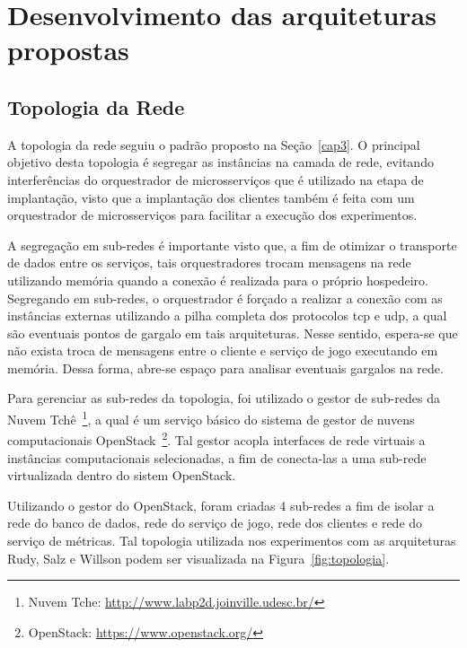  
\chapter{Desenvolvimento das arquiteturas propostas}
\label{cap5}


\section{Topologia da Rede}
\label{sec:topologia}

A topologia da rede seguiu o padrão proposto na Seção~\ref{cap3}.
%
O principal objetivo desta topologia é segregar as instâncias na camada de rede, evitando interferências do orquestrador de microsserviços que é utilizado na etapa de implantação, visto que a implantação dos clientes também é feita com um orquestrador de microsserviços para facilitar a execução dos experimentos.

A segregação em sub-redes é importante visto que, a fim de otimizar o transporte de dados entre os serviços, tais orquestradores trocam mensagens na rede utilizando memória quando a conexão é realizada para o próprio hospedeiro.
%
Segregando em sub-redes, o orquestrador é forçado a realizar a conexão com as instâncias externas utilizando a pilha completa dos protocolos \ac{tcp} e \ac{udp}, a qual são eventuais pontos de gargalo em tais arquiteturas.
%
Nesse sentido, espera-se que não exista troca de mensagens entre o cliente e serviço de jogo executando em memória.
%
Dessa forma, abre-se espaço para analisar eventuais gargalos na rede.

Para gerenciar as sub-redes da topologia, foi utilizado o gestor de sub-redes da Nuvem Tchê~\footnote{Nuvem Tche: \url{http://www.labp2d.joinville.udesc.br/}}, a qual é um serviço básico do sistema de gestor de nuvens computacionais OpenStack~\footnote{OpenStack: \url{https://www.openstack.org/}}.
%
Tal gestor acopla interfaces de rede virtuais a instâncias computacionais selecionadas, a fim de conecta-las a uma sub-rede virtualizada dentro do sistem OpenStack.

Utilizando o gestor do OpenStack, foram criadas 4 sub-redes a fim de isolar a rede do banco de dados, rede do serviço de jogo, rede dos clientes e rede do serviço de métricas.
%
Tal topologia utilizada nos experimentos com as arquiteturas Rudy, Salz e Willson podem ser visualizada na Figura~\ref{fig:topologia}.


